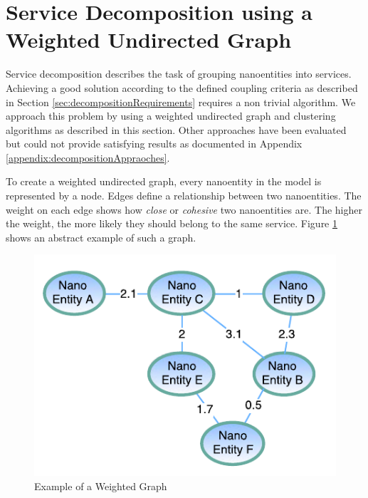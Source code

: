 \section{Service Decomposition using a Weighted Undirected Graph}
\label{subsec:approach1_graph}

Service decomposition describes the task of grouping nanoentities into services. Achieving a good solution according to the defined coupling criteria as described in Section \ref{sec:decompositionRequirements} requires a non trivial algorithm. We approach this problem by using a weighted undirected graph and clustering algorithms as described in this section. Other approaches have been evaluated but could not provide satisfying results as documented in Appendix \ref{appendix:decompositionAppraoches}.

\begin{minipage}[t]{0.6\textwidth}
	\setlength{\parskip}{5pt plus 0.1pt}	
	To create a weighted undirected graph, every nanoentity in the model is represented by a node. Edges define a relationship between two nanoentities. The weight on each edge shows how \textit{close} or \textit{cohesive} two nanoentities are. The higher the weight, the more likely they should belong to the same service. Figure \ref{fig:weighted_graph} shows an abstract example of such a graph.
\end{minipage}
\begin{minipage}[t]{0.4\textwidth}
	
	
	\begin{figure}[H]
		\includegraphics[scale=0.8]{diagrams/weighted_graph.pdf}
		\caption{Example of a Weighted Graph}
		\label{fig:weighted_graph}
	\end{figure}
	
\end{minipage}

